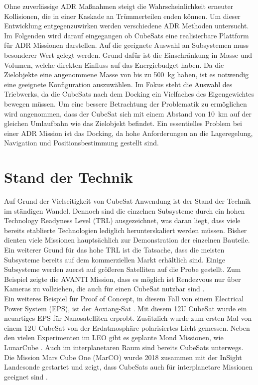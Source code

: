 Ohne zuverlässige ADR Maßnahmen steigt die Wahrscheinlichkeit erneuter Kollisionen, die in einer Kaskade an Trümmerteilen enden können. Um dieser Entwicklung entgegenzuwirken werden verschiedene ADR Methoden untersucht.
Im Folgenden wird darauf eingegangen ob CubeSats eine realisierbare Plattform für ADR Missionen darstellen.
Auf die geeignete Auswahl an Subsystemen muss besonderer Wert gelegt werden. Grund dafür ist die Einschränkung in Masse und Volumen, welche direkten Einfluss auf das Energiebudget haben. Da die Zielobjekte eine angenommene Masse von bis zu \SI{500}{\kilogram} haben, ist es notwendig eine geeignete Konfiguration auszuwählen. Im Fokus steht die Auswahl des Triebwerks, da die CubeSats nach dem Docking ein Vielfaches des Eigengewichtes bewegen müssen. Um eine bessere Betrachtung der Problematik zu ermöglichen wird angenommen, dass der CubeSat sich mit einem Abstand von \SI{10}{\kilo\metre} auf der gleichen Umlaufbahn wie das Zielobjekt befindet. Ein essentielles Problem bei einer ADR Mission ist das Docking, da hohe Anforderungen an die Lageregelung, Navigation und Positionsbestimmung gestellt sind. 

		\section{Stand der Technik}
		
Auf Grund der Vielseitigkeit von CubeSat Anwendung ist der Stand der Technik im ständigen Wandel. Dennoch sind die einzelnen Subsysteme durch ein hohen Technology Readyness Level (TRL) ausgezeichnet, was daran liegt, dass viele bereits etablierte Technologien lediglich herunterskaliert werden müssen. Bisher dienten viele Missionen hauptsächlich zur Demonstration der einzelnen Bauteile. Ein weiterer Grund für das hohe TRL ist die Tatsache, dass die meisten Subsysteme bereits auf dem kommerziellen Markt erhältlich sind. Einige Subsysteme werden zuerst auf größeren Satelliten auf die Probe gestellt. Zum Beispiel zeigte die AVANTI Mission, dass es möglich ist Rendezvous nur über Kameras zu vollziehen, die auch für einen CubeSat nutzbar sind \cite{Gaias.2018,Gaias.2018b}.\\ Ein weiteres Beispiel für Proof of Concept, in diesem Fall von einem Electrical Power System (EPS), ist der Aoxiang-Sat \cite{Peng.2018}. Mit diesem 12U CubeSat wurde ein neuartiges EPS für Nanosatelliten erprobt. Zusätzlich wurde zum ersten Mal von einem 12U CubeSat von der Erdatmosphäre polarisiertes Licht gemessen. Neben den vielen Experimenten im LEO gibt es geplante Mond Missionen, wie LunarCube \cite{Tsay.2015}. Auch im interplanetaren Raum sind bereits CubeSats unterwegs. Die Mission Mars Cube One (MarCO) wurde 2018 zusammen mit der InSight Landesonde gestartet und zeigt, dass CubeSats auch für interplanetare Missionen geeignet sind \cite{Klesh.2018}.

